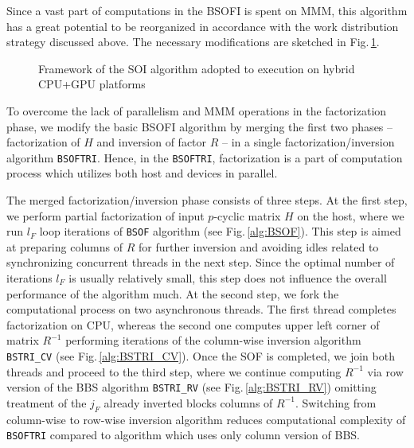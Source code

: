 \documentclass{llncs}
\newcommand{\Bsof}{\texttt{BSOF}\xspace}
\newcommand{\Bsoftri}{\texttt{BSOFTRI}\xspace}
\newcommand{\Bsoi}{\texttt{BSOI}\xspace}
\begin{document}
Since 
a vast part of computations in the BSOFI is spent on MMM,
this algorithm has a great potential to be reorganized 
in accordance with the work distribution strategy discussed above.
The necessary modifications are 
sketched %
in Fig.\,\ref{fig:BSOFI_HostDevice}. 
\begin{figure}[t]%
  \scalebox{0.75}{
    
  }
  \caption{Framework of the SOI algorithm
    adopted to execution on hybrid CPU+GPU platforms%
    \label{fig:BSOFI_HostDevice}}
\end{figure}
To overcome the lack of parallelism and MMM operations 
in the factorization phase,  %
we modify the basic BSOFI algorithm 
by merging the first two phases -- 
factorization of $H$ and inversion of factor $R$ -- 
in a single factorization/inversion algorithm \Bsoftri. 
Hence, in the \Bsoftri,
factorization is a part of computation process which
utilizes both host and devices in parallel.

The merged factorization/inversion phase consists of three steps.
At the first step, 
we perform partial factorization of input $p$-cyclic matrix $H$ 
on the host, where we run $l_F$ loop iterations 
of \Bsof algorithm (see Fig.\,\ref{alg:BSOF}).
This step is aimed at preparing columns of $R$ for further inversion and 
avoiding idles related to synchronizing concurrent threads in the next step.
Since the optimal number of iterations $l_F$ is usually relatively small,
this step does not influence the overall performance of the algorithm much.
At the second step, 
we fork the computational process on two asynchronous threads.
The first thread completes factorization on CPU,  
whereas the second one computes upper left corner of matrix $R^{-1}$
performing iterations of the column-wise inversion 
algorithm {\tt BSTRI\_CV} (see Fig.\,\ref{alg:BSTRI_CV}).
Once the SOF is completed, 
we join both threads and proceed to the third step,
where we continue computing $R^{-1}$
via row version of the BBS algorithm {\tt BSTRI\_RV} (see Fig.\,\ref{alg:BSTRI_RV})
omitting treatment of the $j_F$ already inverted blocks columns of $R^{-1}$.
Switching from column-wise to row-wise inversion algorithm 
reduces computational complexity of \Bsoftri 
compared to algorithm which uses only column version of BBS.
\end{document}
